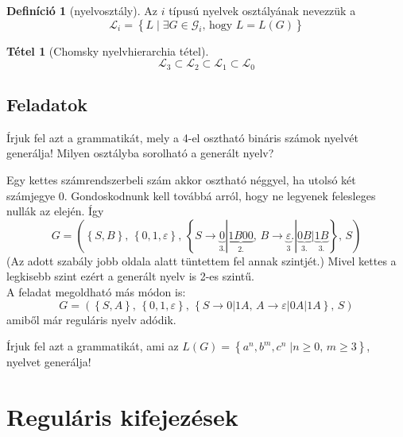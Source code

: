 \documentclass[a4paper,12pt]{article}
\theoremstyle{definition}
\newtheorem*{definition*}{Definíció}
\newtheorem{theorem}{Tétel}
\begin{document}
	\begin{definition*}[nyelvosztály]
		Az $i$ típusú nyelvek osztályának nevezzük a 
		\[
		\mathcal{L}_i = \left\lbrace L \; | \; \exists G \in \mathcal{G}_i \text{, hogy } L = L(G) \right\rbrace 
		\]
	\end{definition*}
	
	\begin{theorem}[Chomsky nyelvhierarchia tétel]
		\[
			\mathcal{L}_3 \subset \mathcal{L}_2 \subset \mathcal{L}_1 \subset \mathcal{L}_0
		\]
	\end{theorem}
	
	\subsection{Feladatok}
	\setcounter{question}{0}
	\begin{question}
		Írjuk fel azt a grammatikát, mely a 4-el osztható bináris számok nyelvét generálja! Milyen osztályba sorolható a generált nyelv?
	\end{question}

	\begin{solution}
		Egy kettes számrendszerbeli szám akkor osztható néggyel, ha utolsó két számjegye 0. Gondoskodnunk kell továbbá arról, hogy ne legyenek felesleges nullák az elején. Így
		\[
		G = \left( \left\lbrace S, B \right\rbrace, \, \left\lbrace 0,1, \varepsilon \right\rbrace, \, \left\lbrace  S \rightarrow \underbrace{0}_{3.} | \underbrace{1B00}_{2.}, \,  B \rightarrow \underbrace{\varepsilon}_3.|\underbrace{0B}_{3.}|\underbrace{1B}_{3.} \right\rbrace , \, S \right)
		\]
		(Az adott szabály jobb oldala alatt tüntettem fel annak szintjét.) Mivel kettes a legkisebb szint ezért a generált nyelv is 2-es szintű.
		\\[4pt]
		A feladat megoldható más módon is:
		\[
		G = \left( \left\lbrace S, A \right\rbrace, \, \left\lbrace 0,1, \varepsilon \right\rbrace, \, \left\lbrace  S \rightarrow 0 | 1A, \,  A \rightarrow \varepsilon|0A|1A \right\rbrace , \, S \right)
		\]
		amiből már reguláris nyelv adódik.
	\end{solution}

	\begin{question}
		Írjuk fel azt a grammatikát, ami az $ L(G) = \left\lbrace a^n, b^m, c^n \; | n \ge 0, \, m \ge 3 \right\rbrace  $, nyelvet generálja!
	\end{question}
	
	\section{Reguláris kifejezések}

	
\end{document}

